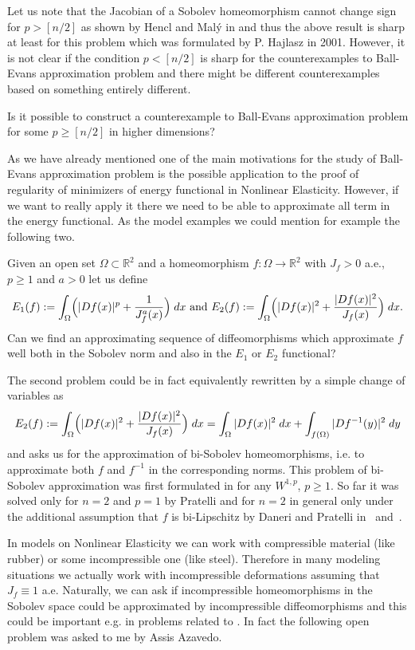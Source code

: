 \documentclass[12pt,a4paper]{amsart}
\theoremstyle{plain}
\theoremstyle{definition}
\numberwithin{equation}{section}
\def\er{\mathbb R}
\newcounter{problem}
\begin{document}
Let us note that the Jacobian of a Sobolev homeomorphism cannot change sign for $p>[n/2]$ as shown by Hencl and Mal\'y in \cite{HM} and thus the above result is sharp at least for this problem which was formulated by P. Hajlasz in 2001. However, it is not clear if the condition $p<[n/2]$ is sharp for the counterexamples to Ball-Evans approximation problem and there might be different counterexamples based on something entirely different.  

 Is it possible to construct a counterexample to Ball-Evans approximation problem for some $p\geq [n/2]$ in higher dimensions? 

\vskip 10pt

As we have already mentioned one of the main motivations for the study of Ball-Evans approximation problem is the possible application to the proof of regularity of minimizers of energy functional in Nonlinear Elasticity. However, if we want to really apply it there we need to be able to approximate all term in the energy functional. As the model examples we could mention for example the following two. 

 Given an open set $\Omega\subset\er^2$ and a homeomorphism $f:\Omega\to\er^2$ with $J_f>0$ a.e., $p\geq 1$ and $a>0$ let us define 
$$
E_1(f):=\int_{\Omega} \Bigl(|Df(x)|^p+\frac{1}{J_f^a(x)}\Bigr)\; dx\text{ and } E_2(f):=\int_{\Omega} \Bigl(|Df(x)|^2+\frac{|Df(x)|^2}{J_f(x)}\Bigr)\; dx.
$$
Can we find an approximating sequence of diffeomorphisms which approximate $f$ well both in the Sobolev norm and also in the $E_1$ or $E_2$ functional? 

\vskip 10pt

The second problem could be in fact equivalently rewritten by a simple change of variables as 
$$
E_2(f):=\int_{\Omega} \Bigl(|Df(x)|^2+\frac{|Df(x)|^2}{J_f(x)}\Bigr)\; dx=\int_{\Omega} |Df(x)|^2\; dx+\int_{f(\Omega)} |Df^{-1}(y)|^2\; dy
$$
and asks us for the approximation of bi-Sobolev homeomorphisms, i.e. to approximate both $f$ and $f^{-1}$ in the corresponding norms. This problem of bi-Sobolev approximation was first formulated in \cite{IKO} for any $W^{1,p}$, $p\geq 1$. So far it was solved only for $n=2$ and $p=1$ by Pratelli \cite{BiP} and for $n=2$ in general only under the additional assumption that $f$ is bi-Lipschitz by Daneri and Pratelli in~\cite{DP} and~\cite{DP2}. 

\vskip 10pt

In models on Nonlinear Elasticity we can work with compressible material (like rubber) or some incompressible one (like steel). 
Therefore in many modeling situations we actually work with incompressible deformations assuming that $J_f\equiv 1$ a.e. 
Naturally, we can ask if incompressible homeomorphisms in the Sobolev space could be approximated by incompressible diffeomorphisms and this could be important e.g. in problems related to \cite{AABT}. In fact the following open problem was asked to me by Assis Azavedo. 
\end{document}
